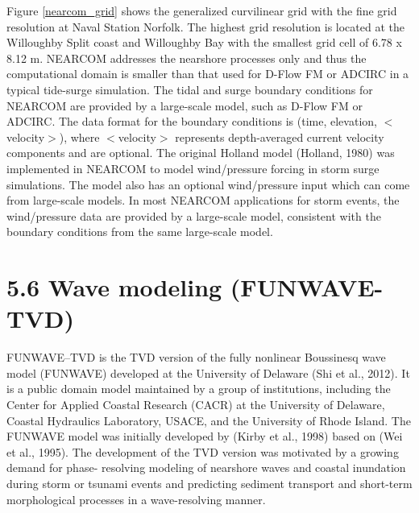 \documentclass[11pt]{article}
\begin{document}
Figure \ref{nearcom_grid} shows the generalized curvilinear grid with the fine grid resolution at Naval Station Norfolk. The highest grid resolution is located at the Willoughby Split coast and Willoughby Bay with the smallest grid cell of 6.78 x 8.12 m. NEARCOM addresses the nearshore processes only and thus the computational domain is smaller than that used for D-Flow FM or ADCIRC in a typical tide-surge simulation. The tidal and surge boundary conditions for NEARCOM are provided by a large-scale model, such as D-Flow FM or ADCIRC. The data format for the boundary conditions is (time, elevation, $<$velocity$>$), where $<$velocity$>$ represents depth-averaged current velocity components and are optional.
The original Holland model (Holland, 1980) was implemented in NEARCOM to model wind/pressure forcing in storm surge simulations. The model also has an optional wind/pressure input which can come from large-scale models. In most NEARCOM applications for storm events, the wind/pressure data are provided by a large-scale model, consistent with the boundary conditions from the same large-scale model.

\section*{5.6 Wave modeling (FUNWAVE-TVD)}
FUNWAVE–TVD is the TVD version of the fully nonlinear Boussinesq wave model (FUNWAVE) developed at the University of Delaware (Shi et al., 2012). It is a public domain model maintained by a group of institutions, including the Center for Applied Coastal Research (CACR) at the University of Delaware, Coastal Hydraulics Laboratory, USACE, and the University of Rhode Island. The FUNWAVE model was initially developed by (Kirby et al., 1998) based on (Wei et al., 1995). The development of the TVD version was motivated by a growing demand for phase- resolving modeling of nearshore waves and coastal inundation during storm or tsunami events and predicting sediment transport and short-term morphological processes in a wave-resolving manner.
\end{document}
